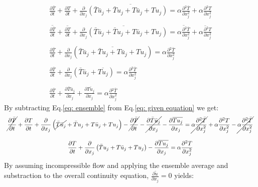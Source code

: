 \documentclass[11pt, a4paper]{article}
\newcommand{\parder}[2]{\frac{\partial {#1}}{\partial {#2}}}
\begin{document}
\begin{equation}
    \begin{array}{c}
        \overline{\displaystyle \parder{\bar{T}}{t}+\parder{T}{t}+\parder{}{x_j}\left(\bar{T}\bar{u}_j+\bar{T}u_j+T\bar{u}_j+Tu_j\right)=\displaystyle \alpha\parder{^2\bar{T}}{x^2_j}+\alpha\parder{^2T}{x^2_j}} \\\\
        \overline{\displaystyle \parder{\bar{T}}{t}}+\overline{\displaystyle\parder{T}{t}}+\overline{\displaystyle\parder{}{x_j}\left(\bar{T}\bar{u}_j+\bar{T}u_j+T\bar{u}_j+Tu_j\right)}=\overline{\displaystyle \alpha\parder{^2\bar{T}}{x^2_j}}+\overline{\displaystyle\alpha\parder{^2T}{x^2_j}} \\\\
        \displaystyle \parder{\bar{T}}{t}+\displaystyle\parder{}{x_j}\left(\overline{\bar{T}\bar{u}_j+\bar{T}u_j+T\bar{u}_j+Tu_j}\right)=\displaystyle \alpha\parder{^2\bar{T}}{x^2_j} \\\\
        \displaystyle \parder{\bar{T}}{t}+\displaystyle\parder{}{x_j}\left(\bar{T}\bar{u}_j+\overline{Tu_j}\right)=\displaystyle \alpha\parder{^2\bar{T}}{x^2_j} \\\\
        \displaystyle \parder{\bar{T}}{t}+\displaystyle\parder{\bar{T}\bar{u}_j}{x_j}+\parder{\overline{Tu_j}}{x_j}=\displaystyle \alpha\parder{^2\bar{T}}{x^2_j}
        \label{eq: ensemble}
    \end{array}
\end{equation}
By subtracting Eq.\ref{eq: ensemble} from Eq.\ref{eq: given equation} we get:
\begin{equation}
    \begin{array}{c}
        \displaystyle \cancel{\parder{\bar{T}}{t}}+\parder{T}{t}+\parder{}{x_j}\left(\cancel{\bar{T}\bar{u}_j}+\bar{T}u_j+T\bar{u}_j+Tu_j\right)-\cancel{\parder{\bar{T}}{t}}-\cancel{\parder{\bar{T}\bar{u}_j}{x_j}}-\parder{\overline{Tu_j}}{x_j}=\cancel{\alpha\parder{^2\bar{T}}{x^2_j}}+\alpha\parder{^2T}{x^2_j}-\cancel{\alpha\parder{^2\bar{T}}{x^2_j}} \\\\
        \displaystyle \parder{T}{t}+\parder{}{x_j}\left(\bar{T}u_j+T\bar{u}_j+Tu_j\right)-\parder{\overline{Tu_j}}{x_j}=\alpha\parder{^2T}{x^2_j}
        \label{eq: subtraction equation}
    \end{array}
\end{equation}
By assuming incompressible flow and applying the ensemble average and substraction to the overall continuity equation, $\displaystyle\parder{\tilde{u}}{x_j}=0$ yields: %
\end{document}
